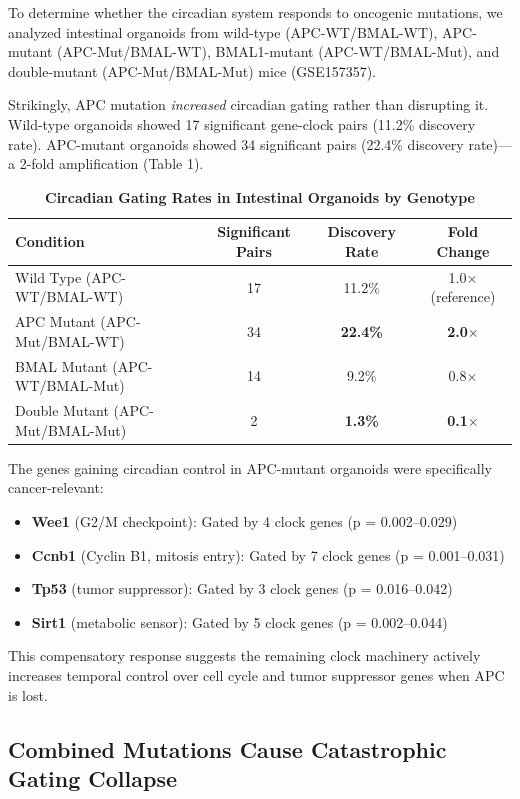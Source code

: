\documentclass[11pt,letterpaper]{article}
\begin{document}
To determine whether the circadian system responds to oncogenic mutations, we analyzed intestinal organoids from wild-type (APC-WT/BMAL-WT), APC-mutant (APC-Mut/BMAL-WT), BMAL1-mutant (APC-WT/BMAL-Mut), and double-mutant (APC-Mut/BMAL-Mut) mice (GSE157357).

Strikingly, APC mutation \textit{increased} circadian gating rather than disrupting it. Wild-type organoids showed 17 significant gene-clock pairs (11.2\% discovery rate). APC-mutant organoids showed 34 significant pairs (22.4\% discovery rate)---a 2-fold amplification (Table 1).

\begin{table}[H]
\centering
\caption{\textbf{Circadian Gating Rates in Intestinal Organoids by Genotype}}
\begin{tabular}{lccc}
\toprule
\textbf{Condition} & \textbf{Significant Pairs} & \textbf{Discovery Rate} & \textbf{Fold Change} \\
\midrule
Wild Type (APC-WT/BMAL-WT) & 17 & 11.2\% & 1.0$\times$ (reference) \\
APC Mutant (APC-Mut/BMAL-WT) & 34 & \textbf{22.4\%} & \textbf{2.0$\times$} \\
BMAL Mutant (APC-WT/BMAL-Mut) & 14 & 9.2\% & 0.8$\times$ \\
Double Mutant (APC-Mut/BMAL-Mut) & 2 & \textbf{1.3\%} & \textbf{0.1$\times$} \\
\bottomrule
\end{tabular}
\label{tab:intestinal}
\end{table}

The genes gaining circadian control in APC-mutant organoids were specifically cancer-relevant:
\begin{itemize}
    \item \textbf{Wee1} (G2/M checkpoint): Gated by 4 clock genes (p = 0.002--0.029)
    \item \textbf{Ccnb1} (Cyclin B1, mitosis entry): Gated by 7 clock genes (p = 0.001--0.031)
    \item \textbf{Tp53} (tumor suppressor): Gated by 3 clock genes (p = 0.016--0.042)
    \item \textbf{Sirt1} (metabolic sensor): Gated by 5 clock genes (p = 0.002--0.044)
\end{itemize}

This compensatory response suggests the remaining clock machinery actively increases temporal control over cell cycle and tumor suppressor genes when APC is lost.

\subsection{Combined Mutations Cause Catastrophic Gating Collapse}
\end{document}
